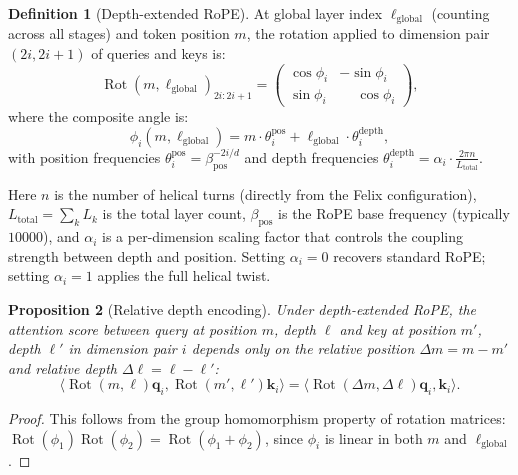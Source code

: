 \documentclass[11pt,a4paper]{article}
\theoremstyle{definition}
\newtheorem{definition}{Definition}[section]
\theoremstyle{plain}
\newtheorem{proposition}[definition]{Proposition}
\theoremstyle{remark}
\newcommand{\Rot}{\operatorname{Rot}}
\begin{document}
\begin{definition}[Depth-extended RoPE]\label{def:depth-rope}
At global layer index $\ell_{\text{global}}$ (counting across all stages) 
and token position $m$, the rotation applied to dimension pair 
$(2i, 2i+1)$ of queries and keys is:
\begin{equation}\label{eq:depth-rope}
  \Rot(m, \ell_{\text{global}})_{2i:2i+1} = 
  \begin{pmatrix} 
    \cos\phi_i & -\sin\phi_i \\ 
    \sin\phi_i & \phantom{-}\cos\phi_i 
  \end{pmatrix},
\end{equation}
where the composite angle is:
\begin{equation}\label{eq:composite-angle}
  \phi_i(m, \ell_{\text{global}}) = m \cdot \theta_i^{\text{pos}} + 
  \ell_{\text{global}} \cdot \theta_i^{\text{depth}},
\end{equation}
with position frequencies $\theta_i^{\text{pos}} = 
\beta_{\text{pos}}^{-2i/d}$ and depth frequencies 
$\theta_i^{\text{depth}} = \alpha_i \cdot 
\frac{2\pi n}{L_{\text{total}}}$.
\end{definition}

Here $n$ is the number of helical turns (directly from the Felix 
configuration), $L_{\text{total}} = \sum_k L_k$ is the total layer count, 
$\beta_{\text{pos}}$ is the RoPE base frequency (typically $10000$), and 
$\alpha_i$ is a per-dimension scaling factor that controls the coupling 
strength between depth and position. Setting $\alpha_i = 0$ recovers 
standard RoPE; setting $\alpha_i = 1$ applies the full helical twist.

\begin{proposition}[Relative depth encoding]\label{prop:rel-depth}
Under depth-extended RoPE, the attention score between query at position 
$m$, depth $\ell$ and key at position $m'$, depth $\ell'$ in dimension 
pair $i$ depends only on the relative position $\Delta m = m - m'$ and 
relative depth $\Delta\ell = \ell - \ell'$:
\begin{equation}
  \langle \Rot(m, \ell)\mathbf{q}_i, \Rot(m', \ell')\mathbf{k}_i\rangle 
  = \langle \Rot(\Delta m, \Delta\ell)\mathbf{q}_i, 
  \mathbf{k}_i\rangle.
\end{equation}
\end{proposition}
\begin{proof}
This follows from the group homomorphism property of rotation matrices: 
$\Rot(\phi_1)\Rot(\phi_2) = \Rot(\phi_1 + \phi_2)$, since $\phi_i$ is 
linear in both $m$ and $\ell_{\text{global}}$.
\end{proof}
\end{document}
